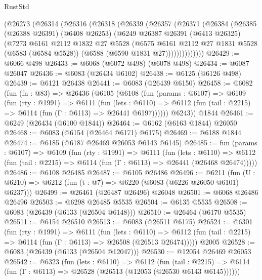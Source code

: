 \begin{lexlean}{RustStd}
\begin{coremodule}
    (@26273
      (@26314
        (@26316
          (@26318
            (@26339
              (@26357
                (@26371
                  (@26384
                    (@26385
                      (@26388 @26391)
                      (@6408 @26253)
                      (@6249
                        @26387
                        @26391
                        (@6413 @26325)
                        (@7273
                          @6161
                          @2112
                          @1832
                          @27
                          @5528
                          (@6575
                            @6161
                            @2112
                            @27
                            @1831
                            @5528
                            (@6583 (@6584 @5528))
                            (@6588 (@6590 @1831 @27))))))))))))))
@26429 := @6066 @498
@26433 := @6068 (@6072 @498) (@6078 @498)
@26434 := @6087 @26047
@26436 := @6083 (@26434 @6102)
@26438 := @6125 (@6126 @498)
@26439 := @6121 @26438
@26441 := @6083 (@26439 @6150)
@26458 := @6082
    (fun (fn : @83) =>
    @26436
      (@6105
        (@6108
          (fun (params : @6107) =>
          @6109
            (fun (rty : @1991) =>
            @6111
              (fun (lets : @6110) =>
              @6112 (fun (tail : @2215) => @6114 (fun (Γ : @6113) => @26441 @6197))))))
        @6243))
    @1844
@26461 := @6249 (@26434 (@6100 @1844))
@26464 := @6162 (@6163 @1844) @26050
@26468 := @6083 (@6154 (@26464 @6171) @6175)
@26469 := @6188 @1844
@26474 := @6185 (@6187 @26469 @26053 @6143 @6145)
@26485 := fun (params : @6107) =>
  @6109
    (fun (rty : @1991) =>
    @6111
      (fun (lets : @6110) =>
      @6112 (fun (tail : @2215) => @6114 (fun (Γ : @6113) => @26441 (@26468 @26474)))))
@26486 := @6108 @26485
@26487 := @6105 @26486
@26496 := @6211
    (fun (U : @6210) => @6212 (fun (t : @7) => @6220 (@6083 (@6226 @26050 @6101) @6237)))
@26499 := @26461 (@26487 @26496) @26048
@26501 := @6068 @26486 @26496
@26503 := @6298 @26485 @5535
@26504 := @6135 @5535
@26508 := @6083 (@26439 (@6133 (@26504 @6148)))
@26510 := @26464 (@6170 @5535)
@26511 := @6154 @26510
@26513 := @6083 (@26511 @6175)
@26524 := @6301
    (fun (rty : @1991) =>
    @6111
      (fun (lets : @6110) =>
      @6112 (fun (tail : @2215) => @6114 (fun (Γ : @6113) => @26508 (@26513 @26474)))))
    @2005
@26528 := @6083 (@26439 (@6133 (@26504 @12047)))
@26530 := @12054 @26469 @26053
@26542 := @6323
    (fun (lets : @6110) =>
    @6112
      (fun (tail : @2215) =>
      @6114 (fun (Γ : @6113) => @26528 (@26513 (@12053 (@26530 @6143 @6145))))))

\end{coremodule}
\end{lexlean}
